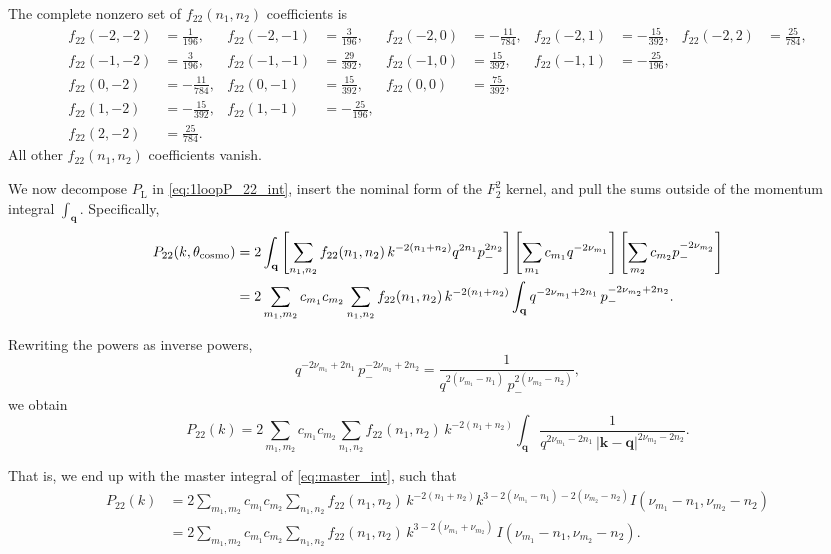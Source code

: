 \documentclass[a4paper,11pt]{article}
\def\Plin{P_{\rm L}}
\newcommand{\<}{\langle}
\renewcommand{\>}{\rangle}
\def\Plin{P_\text{L}}
\begin{document}
The complete nonzero set of \(f_{22}(n_1,n_2)\) coefficients is
\begin{align}
f_{22}(-2,-2) &= \frac{1}{196},
&
f_{22}(-2,-1) &= \frac{3}{196},
&
f_{22}(-2,0) &= -\frac{11}{784},
&
f_{22}(-2,1) &= -\frac{15}{392},
&
f_{22}(-2,2) &= \frac{25}{784},
\\
f_{22}(-1,-2) &= \frac{3}{196},
&
f_{22}(-1,-1) &= \frac{29}{392},
&
f_{22}(-1,0) &= \frac{15}{392},
&
f_{22}(-1,1) &= -\frac{25}{196},
\\
f_{22}(0,-2) &= -\frac{11}{784},
&
f_{22}(0,-1) &= \frac{15}{392},
&
f_{22}(0,0) &= \frac{75}{392},
\\
f_{22}(1,-2) &= -\frac{15}{392},
&
f_{22}(1,-1) &= -\frac{25}{196},
\\
f_{22}(2,-2) &= \frac{25}{784}.
\end{align}
All other \(f_{22}(n_1,n_2)\) coefficients vanish.

We now decompose \(\Plin\) in \cref{eq:1loopP_22_int}, insert the nominal form of the \(F_2^2\) kernel, and pull the sums outside of the momentum integral \(\int_{\mathbf q}\). Specifically,
\begin{align}
P_{22}(k,\theta_{\rm cosmo})
&=
2\int_{\mathbf q}
\left[
\sum_{n_1,n_2} f_{22}(n_1,n_2)\,
k^{-2(n_1+n_2)}q^{2n_1}p_-^{2n_2}
\right]
\left[
\sum_{m_1} c_{m_1} q^{-2\nu_{m_1}}
\right]
\left[
\sum_{m_2} c_{m_2} p_-^{-2\nu_{m_2}}
\right]
\nonumber\\
&=
2\sum_{m_1,m_2} c_{m_1}c_{m_2}
\sum_{n_1,n_2}
f_{22}(n_1,n_2)\,
k^{-2(n_1+n_2)}
\int_{\mathbf q}
q^{-2\nu_{m_1}+2n_1}\,
p_-^{-2\nu_{m_2}+2n_2}.
\end{align}

Rewriting the powers as inverse powers,
\begin{equation}
q^{-2\nu_{m_1}+2n_1}\,p_-^{-2\nu_{m_2}+2n_2}
=
\frac{1}{q^{2(\nu_{m_1}-n_1)}\,p_-^{2(\nu_{m_2}-n_2)}},
\end{equation}
we obtain
\begin{equation}
P_{22}(k)
=
2\sum_{m_1,m_2} c_{m_1}c_{m_2}
\sum_{n_1,n_2}
f_{22}(n_1,n_2)\,
k^{-2(n_1+n_2)}
\int_{\mathbf q}
\frac{1}{q^{2\nu_{m_1}-2n_1}\,|\mathbf k-\mathbf q|^{2\nu_{m_2}-2n_2}}.
\end{equation}

That is, we end up with the master integral of \cref{eq:master_int}, such that
\begin{align}
P_{22}(k)
&=
2\sum_{m_1,m_2} c_{m_1}c_{m_2}
\sum_{n_1,n_2}
f_{22}(n_1,n_2)\,
k^{-2(n_1+n_2)}
k^{3-2(\nu_{m_1}-n_1)-2(\nu_{m_2}-n_2)}
I(\nu_{m_1}-n_1,\nu_{m_2}-n_2)
\nonumber\\
&=
2\sum_{m_1,m_2} c_{m_1}c_{m_2}
\sum_{n_1,n_2}
f_{22}(n_1,n_2)\,
k^{3-2(\nu_{m_1}+\nu_{m_2})}\,
I(\nu_{m_1}-n_1,\nu_{m_2}-n_2).
\label{eq:P22_explicit_sums_over_coefficients}
\end{align}
\end{document}
